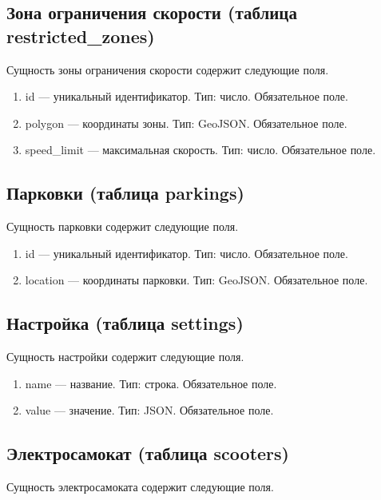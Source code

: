 \subsection{Зона ограничения скорости (таблица restricted\_zones)}

Сущность зоны ограничения скорости содержит следующие поля.

\begin{enumerate}
    \item id --- уникальный идентификатор. Тип: число. Обязательное поле.
    \item polygon --- координаты зоны. Тип: GeoJSON. Обязательное поле.
    \item speed\_limit --- максимальная скорость. Тип: число. Обязательное поле.
\end{enumerate}

\subsection{Парковки (таблица parkings)}

Сущность парковки содержит следующие поля.

\begin{enumerate}
    \item id --- уникальный идентификатор. Тип: число. Обязательное поле.
    \item location --- координаты парковки. Тип: GeoJSON. Обязательное поле.
\end{enumerate}

\subsection{Настройка (таблица settings)}

Сущность настройки содержит следующие поля.

\begin{enumerate}
    \item name --- название. Тип: строка. Обязательное поле.
    \item value --- значение. Тип: JSON. Обязательное поле.
\end{enumerate}

\subsection{Электросамокат (таблица scooters)}

Сущность электросамоката содержит следующие поля.

